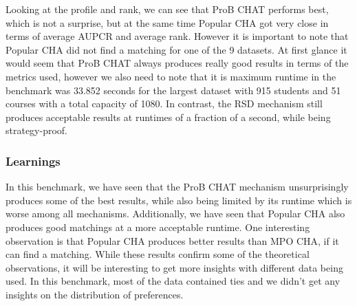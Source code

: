 Looking at the profile and rank, we can see that ProB CHAT performs best, which is not a surprise, but at the same time Popular CHA got very close in terms of average AUPCR and average rank. However it is important to note that Popular CHA did not find a matching for one of the 9 datasets. At first glance it would seem that ProB CHAT always produces really good results in terms of the metrics used, however we also need to note that it is maximum runtime in the benchmark was 33.852 seconds for the largest dataset with 915 students and 51 courses with a total capacity of 1080. In contrast, the RSD mechanism still produces acceptable results at runtimes of a fraction of a second, while being strategy-proof.

\subsubsection{Learnings}
In this benchmark, we have seen that the ProB CHAT mechanism unsurprisingly produces some of the best results, while also being limited by its runtime which is worse among all mechanisms. Additionally, we have seen that Popular CHA also produces good matchings at a more acceptable runtime. One interesting observation is that Popular CHA produces better results than MPO CHA, if it can find a matching. While these results confirm some of the theoretical observations, it will be interesting to get more insights with different data being used. In this benchmark, most of the data contained ties and we didn't get any insights on the distribution of preferences. 
